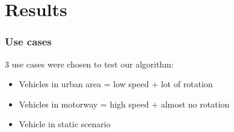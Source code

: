 \documentclass{beamer}
\begin{document}
\section{Results}

	\begin{frame}
		\frametitle{Use cases}
		3 use cases were chosen to test our algorithm:
		\begin{itemize}
		\item Vehicles in urban area =  low speed + lot of rotation
		\item Vehicles in motorway = high speed + almost no rotation
		\item Vehicle in static scenario
		\end{itemize}						
	\end{frame}
\end{document}

